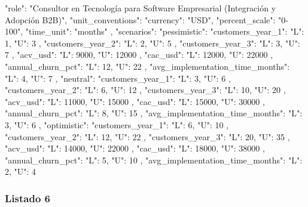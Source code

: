 \begin{APACode}
{
  "role": "Consultor en Tecnología para Software Empresarial (Integración y Adopción B2B)",
  "unit_conventions": {
    "currency": "USD",
    "percent_scale": "0-100",
    "time_unit": "months"
  },
  "scenarios": {
    "pessimistic": {
      "customers_year_1": {
        "L": 1,
        "U": 3
      },
      "customers_year_2": {
        "L": 2,
        "U": 5
      },
      "customers_year_3": {
        "L": 3,
        "U": 7
      },
      "acv_usd": {
        "L": 9000,
        "U": 12000
      },
      "cac_usd": {
        "L": 12000,
        "U": 22000
      },
      "annual_churn_pct": {
        "L": 12,
        "U": 22
      },
      "avg_implementation_time_months": {
        "L": 4,
        "U": 7
      }
    },
    "neutral": {
      "customers_year_1": {
        "L": 3,
        "U": 6
      },
      "customers_year_2": {
        "L": 6,
        "U": 12
      },
      "customers_year_3": {
        "L": 10,
        "U": 20
      },
      "acv_usd": {
        "L": 11000,
        "U": 15000
      },
      "cac_usd": {
        "L": 15000,
        "U": 30000
      },
      "annual_churn_pct": {
        "L": 8,
        "U": 15
      },
      "avg_implementation_time_months": {
        "L": 3,
        "U": 6
      }
    },
    "optimistic": {
      "customers_year_1": {
        "L": 6,
        "U": 10
      },
      "customers_year_2": {
        "L": 12,
        "U": 22
      },
      "customers_year_3": {
        "L": 20,
        "U": 35
      },
      "acv_usd": {
        "L": 14000,
        "U": 22000
      },
      "cac_usd": {
        "L": 18000,
        "U": 38000
      },
      "annual_churn_pct": {
        "L": 5,
        "U": 10
      },
      "avg_implementation_time_months": {
        "L": 2,
        "U": 4
      }
    }
  }
}
\end{APACode}

\subsubsection{Listado 6}
\label{anexo:code-6-3-2-6}

